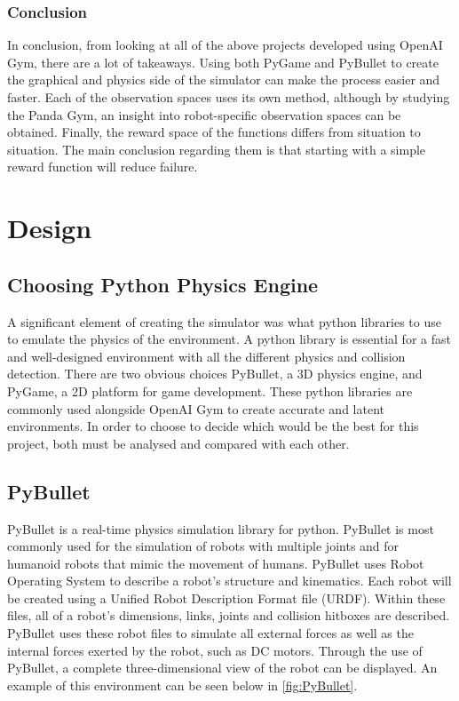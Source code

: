 \documentclass[a4paper,12pt]{article}
\begin{document}
\subsubsection{Conclusion}
In conclusion, from looking at all of the above projects developed using OpenAI Gym, there are a lot of takeaways. Using both PyGame and PyBullet to create the graphical and physics side of the simulator can make the process easier and faster. Each of the observation spaces uses its own method, although by studying the Panda Gym, an insight into robot-specific observation spaces can be obtained. Finally, the reward space of the functions differs from situation to situation. The main conclusion regarding them is that starting with a simple reward function will reduce failure. 

\section{Design}

\subsection{Choosing Python Physics Engine}

A significant element of creating the simulator was what python libraries to use to emulate the physics of the environment. A python library is essential for a fast and well-designed environment with all the different physics and collision detection. There are two obvious choices PyBullet, a 3D physics engine, and PyGame, a 2D platform for game development. These python libraries are commonly used alongside OpenAI Gym to create accurate and latent environments. In order to choose to decide which would be the best for this project, both must be analysed and compared with each other.

\subsection{PyBullet}

PyBullet is a real-time physics simulation library for python. PyBullet is most commonly used for the simulation of robots with multiple joints and for humanoid robots that mimic the movement of humans. PyBullet uses Robot Operating System to describe a robot's structure and kinematics. Each robot will be created using a Unified Robot Description Format file (URDF). Within these files, all of a robot's dimensions, links, joints and collision hitboxes are described. PyBullet uses these robot files to simulate all external forces as well as the internal forces exerted by the robot, such as DC motors. Through the use of PyBullet, a complete three-dimensional view of the robot can be displayed. An example of this environment can be seen below in \autoref{fig:PyBullet}.
\end{document}
